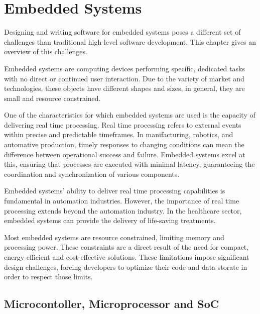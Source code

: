 

\chapter{Embedded Systems}

Designing and writing software for embedded systems poses a different set of
challenges than traditional high-level software development.
This chapter gives an overview of this challenges.

Embedded systems are computing devices performing specific, dedicated tasks
with no direct or continued user interaction. \cite{embedded_systems_architecture}
Due to the variety of market and technologies, these objects have different
shapes and sizes, in general, they are small and resource constrained.

One of the characteristics for which embedded systems are used is the capacity
of delivering real time processing.
Real time processing refers to external events within precise and predictable
timeframes. In manifacturing, robotics, and automative production, timely
responses to changing conditions can mean the difference between operational
success and failure. Embedded systems excel at this, ensuring that processes
are executed with minimal latency, guaranteeing the coordination and
synchronization of various components.

Embedded systems' ability to deliver real time processing capabilities is
fundamental in automation industries. 
However, the importance of real time processing extends beyond the automation
industry. In the healthcare sector, embedded systems can provide the delivery
of life-saving treatments.

Most embedded systems are resource constrained, limiting memory and processing
power.
These constraints are a direct result of the need for compact, energy-efficient
and cost-effective solutions.
These limitations impose significant design challenges, forcing developers to
optimize their code and data storate in order to respect those limits.

\section{Microcontoller, Microprocessor and SoC}

